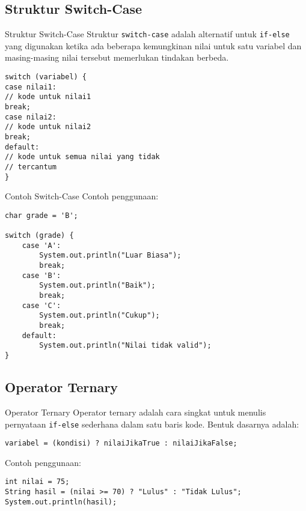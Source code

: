 \documentclass[aspectratio=169, table]{beamer}
\begin{document}
\subsection{Struktur Switch-Case}
\begin{frame}[fragile]{Struktur Switch-Case}
\vspace{25pt}
Struktur \texttt{switch-case} adalah alternatif untuk \texttt{if-else} yang digunakan ketika ada beberapa kemungkinan nilai untuk satu variabel dan masing-masing nilai tersebut memerlukan tindakan berbeda.

\begin{lstlisting}[style=JavaStyle]
switch (variabel) {
case nilai1:
// kode untuk nilai1
break;
case nilai2:
// kode untuk nilai2
break;
default:
// kode untuk semua nilai yang tidak 
// tercantum
}
\end{lstlisting}
\end{frame}

\begin{frame}[fragile]{Contoh Switch-Case}
\vspace{20pt}
Contoh penggunaan:
\begin{lstlisting}[style=JavaStyle]
char grade = 'B';

switch (grade) {
	case 'A':
		System.out.println("Luar Biasa");
		break;
	case 'B':
		System.out.println("Baik");
		break;
	case 'C':
		System.out.println("Cukup");
		break;
	default:
		System.out.println("Nilai tidak valid");
}
\end{lstlisting}
\end{frame}


\subsection{Operator Ternary}
\begin{frame}[fragile]{Operator Ternary}
Operator ternary adalah cara singkat untuk menulis pernyataan \texttt{if-else} sederhana dalam satu baris kode. Bentuk dasarnya adalah:

\begin{lstlisting}[style=JavaStyle]
variabel = (kondisi) ? nilaiJikaTrue : nilaiJikaFalse;
\end{lstlisting}

Contoh penggunaan:

\begin{lstlisting}[style=JavaStyle]
int nilai = 75;
String hasil = (nilai >= 70) ? "Lulus" : "Tidak Lulus";
System.out.println(hasil);
\end{lstlisting}
\end{frame}
\end{document}
